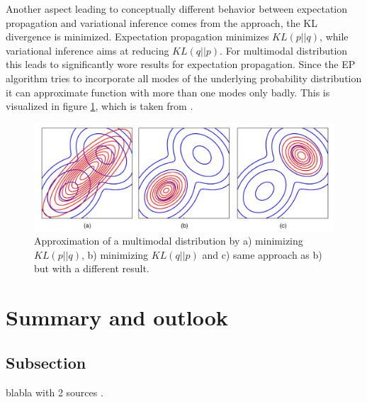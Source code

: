 \documentclass{sigkdd}
\begin{document}
Another aspect leading to conceptually different behavior between expectation propagation and variational inference comes from the approach, the KL divergence is minimized. Expectation propagation minimizes $KL(p||q)$, while variational inference aims at reducing $KL(q||p)$. For multimodal distribution this leads to significantly wore results for expectation propagation. Since the EP algorithm tries to incorporate all modes of the underlying probability distribution it can approximate function with more than one modes only badly. This is visualized in figure \ref{fig:multimodal}, which is taken from \cite{bishop2006prml}.

\begin{figure}[h]
	\begin{center}
		\includegraphics[scale=0.12]{multimodal_approximation.png}
		\caption{Approximation of a multimodal distribution by a) minimizing $KL(p||q)$, b) minimizing $KL(q||p)$ and c) same approach as b) but with a different result.}\label{fig:multimodal}
	\end{center}
\end{figure}
\section{Summary and outlook}


\subsection{Subsection}
blabla with 2 sources \cite{murphy2012machine, bishop2006prml}.
\end{document}
